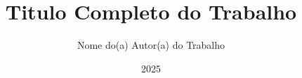 \makeatletter
\newcommand{\cidade}[1]{\gdef\@cidade{#1}}
\newcommand{\faculdade}[1]{\gdef\@faculdade{#1}}
\newcommand{\faculdadesigla}[1]{\gdef\@faculdadesigla{#1}}
\newcommand{\instcomp}[1]{\gdef\@instcomp{#1}}
\newcommand{\instnce}[1]{\gdef\@instnce{#1}}
\newcommand{\instncecurto}[1]{\gdef\@instncecurto{#1}}
\newcommand{\programa}[1]{\gdef\@programa{#1}}
\newcommand{\progsigla}[1]{\gdef\@progsigla{#1}}
\newcommand{\orientadora}[1]{\gdef\@orientadora{#1}}
\newcommand{\coorientadora}[1]{\gdef\@coorientadora{#1}}
\newcommand{\orientadorastitulo}[1]{\gdef\@orientadorastitulo{#1}}


\title{Titulo Completo do Trabalho}
\author{Nome do(a) Autor(a) do Trabalho}
\date{2025}
\cidade{Rio de Janeiro}
\faculdade{Universidade Federal do Rio de Janeiro}
\faculdadesigla{UFRJ}
\instcomp{Instituto de Computação}
\instnce{Instituto Tércio Pacitti de Aplicações e Pesquisas Computacionais}
\instncecurto{Instituto Tércio Pacitti de Aplicações}
\programa{Programa de Pós-Graduação em Informática}
\progsigla{PPGI}
\orientadora{Nome do(a) Orientador(a)}
\coorientadora{Nome do(a) Co-orientador(a)}
\orientadorastitulo{D.SC}
\makeatother